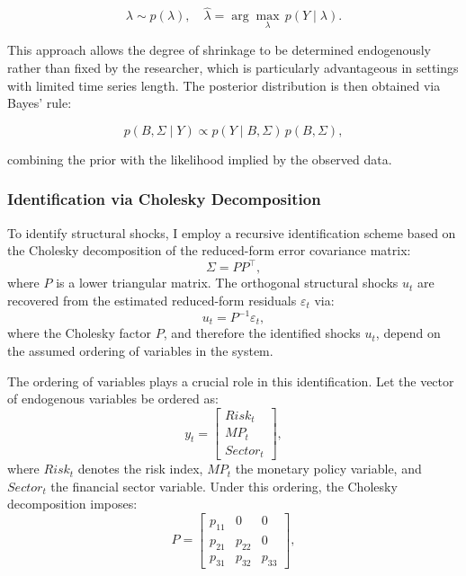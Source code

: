 \documentclass[12pt,a4paper]{report}
\begin{document}
\begin{equation}
\lambda \sim p(\lambda), \quad 
\hat{\lambda} = \arg\max_{\lambda} \, p(Y \mid \lambda).
\end{equation}

This approach allows the degree of shrinkage to be determined endogenously rather than 
fixed by the researcher, which is particularly advantageous in settings with limited 
time series length. The posterior distribution is then obtained via Bayes' rule:

\begin{equation}
p(B, \Sigma \mid Y) \propto p(Y \mid B, \Sigma)\, p(B, \Sigma),
\end{equation}

combining the prior with the likelihood implied by the observed data.

\subsubsection{Identification via Cholesky Decomposition}

To identify structural shocks, I employ a recursive identification scheme based on the 
Cholesky decomposition of the reduced-form error covariance matrix:
\begin{equation}
\Sigma = P P^\top,
\end{equation}
where $P$ is a lower triangular matrix. The orthogonal structural shocks $u_t$ are 
recovered from the estimated reduced-form residuals $\varepsilon_t$ via:
\begin{equation}
u_t = P^{-1} \varepsilon_t,
\end{equation}
where the Cholesky factor $P$, and therefore the identified shocks $u_t$, depend on 
the assumed ordering of variables in the system.

The ordering of variables plays a crucial role in this identification. Let the vector 
of endogenous variables be ordered as:
\begin{equation}
y_t =
\begin{bmatrix}
Risk_t \\ MP_t \\ Sector_t
\end{bmatrix},
\end{equation}
where $Risk_t$ denotes the risk index, $MP_t$ the monetary policy variable, and 
$Sector_t$ the financial sector variable. Under this ordering, the Cholesky 
decomposition imposes:
\begin{equation}
P =
\begin{bmatrix}
p_{11} & 0      & 0      \\
p_{21} & p_{22} & 0      \\
p_{31} & p_{32} & p_{33}
\end{bmatrix},
\end{equation}
\end{document}
